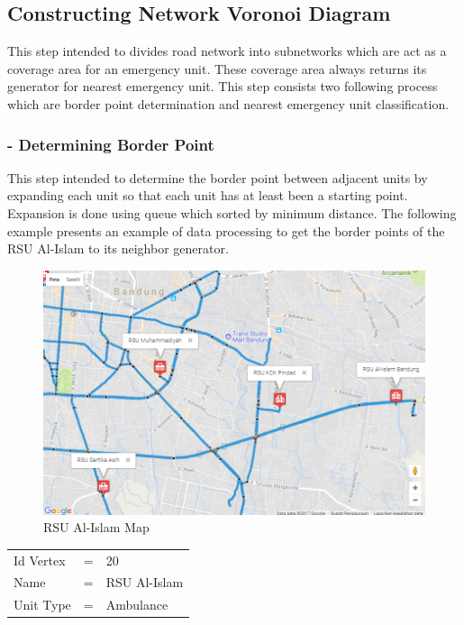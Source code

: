 \subsection{Constructing Network Voronoi Diagram}
This step intended to divides road network into subnetworks which are act as a coverage area for an emergency unit. These coverage area always returns its generator for nearest emergency unit. This step consists two following process which are border point determination and nearest emergency unit classification.

\subsubsection{- Determining Border Point}
This step intended to determine the border point between adjacent units by expanding each unit so that each unit has at least been a starting point. Expansion is done using queue which sorted by minimum distance. The following example presents an example of data processing to get the border points of the RSU Al-Islam to its neighbor generator.

\begin{figure}[H]
    \centering
    \includegraphics[scale=0.53]{data_proc_1_1.png}
    \caption{RSU Al-Islam Map}
    \label{fig:rsu_al-islam_map}
\end{figure}

\begin{table}[H]
\centering
\begin{tabular}{lll}
Id Vertex & = & 20           \\
Name      & = & RSU Al-Islam \\
Unit Type & = & Ambulance   
\end{tabular}
\end{table}

